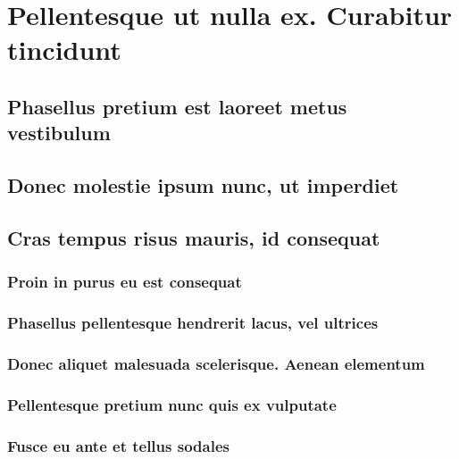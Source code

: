 \documentclass[%
  english,%
]{doctorate}
\begin{document}
\lipsum[1-8]

\section{Pellentesque ut nulla ex. Curabitur tincidunt}

\lipsum[1-8]

\subsection{Phasellus pretium est laoreet metus vestibulum}

\lipsum[1-8]

\subsection{Donec molestie ipsum nunc, ut imperdiet}

\lipsum[1-8]

\subsection{Cras tempus risus mauris, id consequat}

\lipsum[1-8]

\subsubsection{Proin in purus eu est consequat}

\lipsum[1-8]

\subsubsection{Phasellus pellentesque hendrerit lacus, vel ultrices}

\lipsum[1-8]

\subsubsection{Donec aliquet malesuada scelerisque. Aenean elementum}

\lipsum[1-8]

\subsubsection{Pellentesque pretium nunc quis ex vulputate}

\lipsum[1-8]

\subsubsection{Fusce eu ante et tellus sodales}
\end{document}
